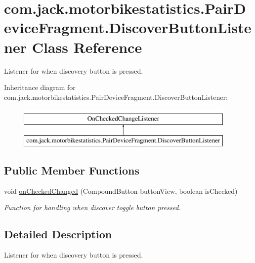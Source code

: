 \hypertarget{classcom_1_1jack_1_1motorbikestatistics_1_1_pair_device_fragment_1_1_discover_button_listener}{}\section{com.\+jack.\+motorbikestatistics.\+Pair\+Device\+Fragment.\+Discover\+Button\+Listener Class Reference}
\label{classcom_1_1jack_1_1motorbikestatistics_1_1_pair_device_fragment_1_1_discover_button_listener}


Listener for when discovery button is pressed.  


Inheritance diagram for com.\+jack.\+motorbikestatistics.\+Pair\+Device\+Fragment.\+Discover\+Button\+Listener\+:\begin{figure}[H]
\begin{center}
\leavevmode
\includegraphics[height=2.000000cm]{classcom_1_1jack_1_1motorbikestatistics_1_1_pair_device_fragment_1_1_discover_button_listener}
\end{center}
\end{figure}
\subsection*{Public Member Functions}
\begin{DoxyCompactItemize}
\item 
void \hyperlink{classcom_1_1jack_1_1motorbikestatistics_1_1_pair_device_fragment_1_1_discover_button_listener_a2bfd9ec10403a45d4d13fb2e035f0cad}{on\+Checked\+Changed} (Compound\+Button button\+View, boolean is\+Checked)
\begin{DoxyCompactList}\small\item\em Function for handling when discover toggle button pressed. \end{DoxyCompactList}\end{DoxyCompactItemize}


\subsection{Detailed Description}
Listener for when discovery button is pressed. 

